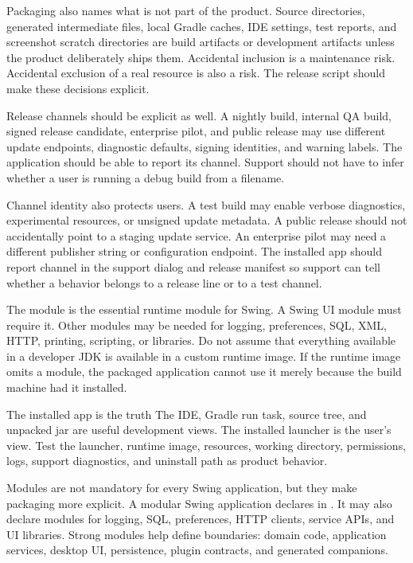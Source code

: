 Packaging also names what is not part of the product. Source directories, generated intermediate files, local Gradle caches, IDE settings, test reports, and screenshot scratch directories are build artifacts or development artifacts unless the product deliberately ships them. Accidental inclusion is a maintenance risk. Accidental exclusion of a real resource is also a risk. The release script should make these decisions explicit.

Release channels should be explicit as well. A nightly build, internal QA build, signed release candidate, enterprise pilot, and public release may use different update endpoints, diagnostic defaults, signing identities, and warning labels. The application should be able to report its channel. Support should not have to infer whether a user is running a debug build from a filename.

Channel identity also protects users. A test build may enable verbose diagnostics, experimental resources, or unsigned update metadata. A public release should not accidentally point to a staging update service. An enterprise pilot may need a different publisher string or configuration endpoint. The installed app should report channel in the support dialog and release manifest so support can tell whether a behavior belongs to a release line or to a test channel.

The  module is the essential runtime module for Swing. A Swing UI module must require it. Other modules may be needed for logging, preferences, SQL, XML, HTTP, printing, scripting, or libraries. Do not assume that everything available in a developer JDK is available in a custom runtime image. If the runtime image omits a module, the packaged application cannot use it merely because the build machine had it installed.

\begin{principlebox}{The installed app is the truth}
The IDE, Gradle run task, source tree, and unpacked jar are useful development views. The installed launcher is the user's view. Test the launcher, runtime image, resources, working directory, permissions, logs, support diagnostics, and uninstall path as product behavior.
\end{principlebox}

Modules are not mandatory for every Swing application, but they make packaging more explicit. A modular Swing application declares  in . It may also declare modules for logging, SQL, preferences, HTTP clients, service APIs, and UI libraries. Strong modules help define boundaries: domain code, application services, desktop UI, persistence, plugin contracts, and generated companions.


